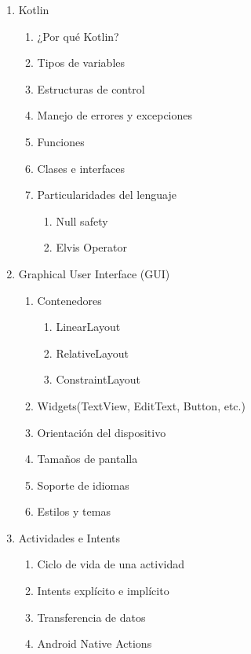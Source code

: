\documentclass[11pt]{mylib/documentoProteco}
\begin{document}
\vspace*{4mm}
\selectfont

\setlength{\footskip}{65pt}

\renewcommand{\labelenumiii}{\roman{enumiii}}
\begin{multicols*}{2}
\begin{enumerate}
  \item Kotlin
  \begin{enumerate}
    \item ¿Por qué Kotlin?
    \item Tipos de variables
    \item Estructuras de control
    \item Manejo de errores y excepciones
    \item Funciones
    \item Clases e interfaces
    \item Particularidades del lenguaje
    \begin{enumerate}
      \item Null safety
      \item Elvis Operator
    \end{enumerate}
  \end{enumerate}

  \item Graphical User Interface (GUI)
  \begin{enumerate}
    \item Contenedores
    \begin{enumerate}
      \item LinearLayout
      \item RelativeLayout
      \item ConstraintLayout
    \end{enumerate}
    \item Widgets(TextView, EditText, Button, etc.)
    \item Orientación del dispositivo
    \item Tamaños de pantalla
    \item Soporte de idiomas
    \item Estilos y temas
  \end{enumerate}

  \item Actividades e Intents
  \begin{enumerate}
    \item Ciclo de vida de una actividad
    \item Intents explícito e implícito
    \item Transferencia de datos
    \item Android Native Actions
  \end{enumerate}


\end{enumerate}
\end{multicols*}
\end{document}
